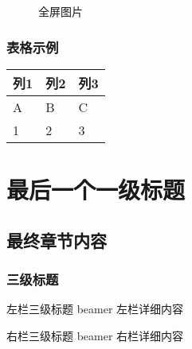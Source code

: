 \begin{figure}
\centering
{}
\caption{全屏图片}
\end{figure}

\subsubsection{表格示例}\label{ux8868ux683cux793aux4f8b}

\begin{longtable}[]{@{}lll@{}}
\toprule\noalign{}
列1 & 列2 & 列3 \\
\midrule\noalign{}
\endhead
\bottomrule\noalign{}
\endlastfoot
A & B & C \\
1 & 2 & 3 \\
\end{longtable}

\section{最后一个一级标题}\label{ux6700ux540eux4e00ux4e2aux4e00ux7ea7ux6807ux9898}

\subsection{最终章节内容}\label{ux6700ux7ec8ux7ae0ux8282ux5185ux5bb9}

\subsubsection{三级标题}\label{ux4e09ux7ea7ux6807ux9898}

左栏三级标题 beamer 左栏详细内容

右栏三级标题 beamer 右栏详细内容
